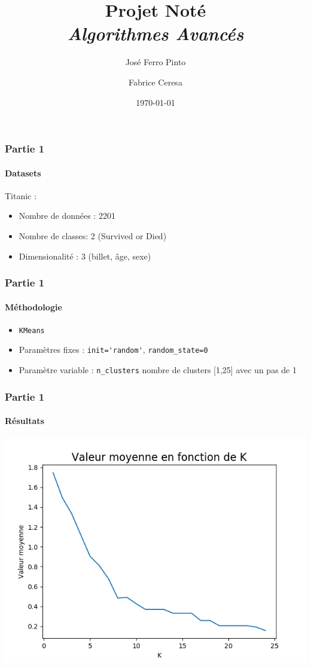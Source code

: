 \documentclass{beamer}
\title [Projet noté] {Projet Noté\\
\large\emph{Algorithmes Avancés}}
\author {José Ferro Pinto\and Fabrice Ceresa}
\institute {HEPIA}
\date {\today}
\begin{document}
    \begin{frame}
        \titlepage
    \end{frame}
    
    \begin{frame}
        \frametitle{Partie 1}
        \framesubtitle{Datasets}
        Titanic :
        \begin{itemize}
         \item Nombre de données : 2201
         \item Nombre de classes: 2 (Survived or Died)
         \item Dimensionalité : 3 (billet, âge, sexe)
        \end{itemize}
    \end{frame}
    
    \begin{frame}[fragile]
        \frametitle{Partie 1}
        \framesubtitle{Méthodologie}
        \begin{itemize}
            \item \verb?KMeans?
            \item Paramètres fixes : \verb?init='random'?, \verb?random_state=0?
        
            \item Paramètre variable : \verb?n_clusters? nombre de clusters [1,25] avec un pas de 1
        \end{itemize}
    \end{frame}
    
    \begin{frame}[fragile]
        \frametitle{Partie 1}
        \framesubtitle{Résultats}
        \includegraphics[scale=0.6]{p1-1}
    \end{frame}
    
\end{document}
